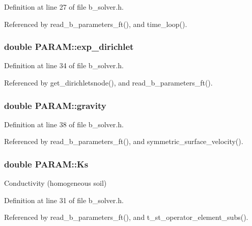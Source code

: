 Definition at line 27 of file b\-\_\-solver.\-h.



Referenced by read\-\_\-b\-\_\-parameters\-\_\-ft(), and time\-\_\-loop().

\hypertarget{struct_p_a_r_a_m_aa2aedc005e74a667c46a2c9989d4bf5c}{
\subsubsection[{exp\-\_\-dirichlet}]{\setlength{\rightskip}{0pt plus 5cm}double P\-A\-R\-A\-M\-::exp\-\_\-dirichlet}}\label{struct_p_a_r_a_m_aa2aedc005e74a667c46a2c9989d4bf5c}


Definition at line 34 of file b\-\_\-solver.\-h.



Referenced by get\-\_\-dirichletsnode(), and read\-\_\-b\-\_\-parameters\-\_\-ft().

\hypertarget{struct_p_a_r_a_m_a95eea229cd995b9c3495257154c5d22f}{
\subsubsection[{gravity}]{\setlength{\rightskip}{0pt plus 5cm}double P\-A\-R\-A\-M\-::gravity}}\label{struct_p_a_r_a_m_a95eea229cd995b9c3495257154c5d22f}


Definition at line 38 of file b\-\_\-solver.\-h.



Referenced by read\-\_\-b\-\_\-parameters\-\_\-ft(), and symmetric\-\_\-surface\-\_\-velocity().

\hypertarget{struct_p_a_r_a_m_a67b007dbf2132a03148c0a8407348e98}{
\subsubsection[{Ks}]{\setlength{\rightskip}{0pt plus 5cm}double P\-A\-R\-A\-M\-::\-Ks}}\label{struct_p_a_r_a_m_a67b007dbf2132a03148c0a8407348e98}
Conductivity (homogeneous soil) 

Definition at line 31 of file b\-\_\-solver.\-h.



Referenced by read\-\_\-b\-\_\-parameters\-\_\-ft(), and t\-\_\-st\-\_\-operator\-\_\-element\-\_\-subs().

